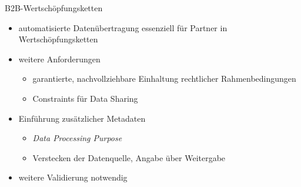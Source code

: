 \begin{frame}{B2B-Wertschöpfungsketten \footnotesize\cite{bothSolidBasedB2BData2025}}
    \begin{itemize}
        \item automatisierte Datenübertragung essenziell für Partner in Wertschöpfungsketten
        \item weitere Anforderungen
        \begin{itemize}
            \item garantierte, nachvollziehbare Einhaltung rechtlicher Rahmenbedingungen
            \item Constraints für Data Sharing
        \end{itemize}
    \end{itemize}
    
    \pause
    \begin{itemize}
        \item Einführung zusätzlicher Metadaten
        \begin{itemize}
            \item \emph{Data Processing Purpose} %
            \item Verstecken der Datenquelle, Angabe über Weitergabe
        \end{itemize}
    \end{itemize}
    
    \pause
    \begin{itemize}
        \item weitere Validierung notwendig
    \end{itemize}
\end{frame}

